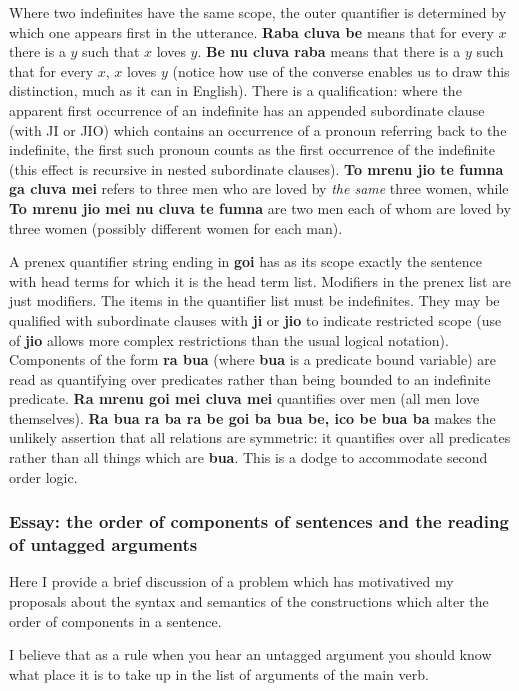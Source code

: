\documentclass[12pt]{book}
\begin{document}
{Where two indefinites have the same scope, the outer quantifier is determined by which one appears first in the utterance.  {\bf Raba cluva be} means that for every $x$ there is a $y$ such that $x$ loves $y$.  {\bf Be nu cluva raba} means that there is a $y$ such that for every $x$, $x$ loves $y$ (notice how use of the converse enables us to draw this distinction, much as it can in English).  There is a qualification:  where the apparent first occurrence of an indefinite has an appended subordinate clause (with JI or JIO) which contains an occurrence of a pronoun referring back to the indefinite, the first such pronoun counts as the first occurrence of the indefinite (this effect is recursive in nested subordinate clauses).  {\bf To mrenu jio te fumna ga cluva mei} refers to three men who are loved by {\em the same\/} three women, while {\bf To mrenu jio mei nu cluva te fumna} are two men each of whom are loved by three women (possibly different women for each man).

A prenex quantifier string ending in {\bf goi} has as its scope exactly the sentence with head terms for which it is the head term list.  Modifiers
in the prenex list are just modifiers.  The items in the quantifier list must be indefinites.  They may be qualified with subordinate clauses with
{\bf ji} or {\bf jio} to indicate restricted scope (use of {\bf jio} allows more complex restrictions than the usual logical notation).  Components of the 
form {\bf ra bua} (where {\bf bua} is a predicate bound variable) are read as quantifying over predicates rather than being bounded to an indefinite predicate.  {\bf Ra mrenu goi mei cluva mei}  quantifies over men (all men love themselves).  {\bf Ra bua ra ba ra be goi ba bua be, ico be bua ba} makes the unlikely assertion that all relations are symmetric:  it quantifies over all predicates rather than all things which are {\bf bua}.  This is a dodge to accommodate second order logic.

\subsubsection{Essay:  the order of components of sentences and the reading of untagged arguments}

Here I provide a brief discussion of a problem which has motivatived my proposals about the syntax and semantics
of the constructions which alter the order of components in a sentence.

I believe that as a rule when you hear an untagged argument you should know what place it is to take up in the list of arguments of the main verb.

}
\end{document}
